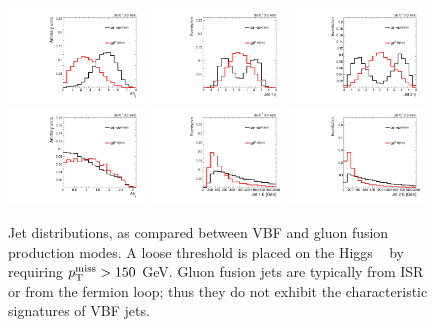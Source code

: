 \begin{figure}[]
    \begin{center}
        \includegraphics[width=0.32\textwidth]{figures/vbf/shapes_signal/loosesignal_jot12DEta.pdf}
        \includegraphics[width=0.32\textwidth]{figures/vbf/shapes_signal/loosesignal_jotEta_0_.pdf}
        \includegraphics[width=0.32\textwidth]{figures/vbf/shapes_signal/loosesignal_jotEta_1_.pdf} \\
        \includegraphics[width=0.32\textwidth]{figures/vbf/shapes_signal/loosesignal_jot12DPhi.pdf}
        \includegraphics[width=0.32\textwidth]{figures/vbf/shapes_signal/loosesignal_jotE_0_.pdf}
        \includegraphics[width=0.32\textwidth]{figures/vbf/shapes_signal/loosesignal_jotE_1_.pdf} 
        \caption{Jet distributions, as compared between VBF and gluon fusion production modes.
                 A loose threshold is placed on the Higgs \pt~  by requiring $p_\mathrm{T}^\mathrm{miss}>150$ GeV.
                 Gluon fusion jets are typically from ISR or from the fermion loop; thus they do not exhibit the characteristic signatures of VBF jets.}
        \label{fig:vbf:sigkins}
    \end{center}
\end{figure}

